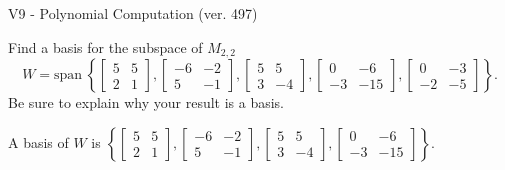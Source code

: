 \begin{exercise}
  \begin{exerciseTitle}V9 - Polynomial Computation (ver. 497)\end{exerciseTitle}
  \begin{exerciseStatement}
    Find a basis for the subspace of \(M_{2,2}\) 
\[W=\mathrm{span}\ \left\{\left[\begin{array}{cc}
5 & 5 \\
2 & 1
\end{array}\right] , \left[\begin{array}{cc}
-6 & -2 \\
5 & -1
\end{array}\right] , \left[\begin{array}{cc}
5 & 5 \\
3 & -4
\end{array}\right] , \left[\begin{array}{cc}
0 & -6 \\
-3 & -15
\end{array}\right] , \left[\begin{array}{cc}
0 & -3 \\
-2 & -5
\end{array}\right]\right\}.\]
 Be sure to explain why your result is a basis.


  \end{exerciseStatement}
  \begin{exerciseAnswer}
   A basis of \(W\) is  \(\left\{\left[\begin{array}{cc}
5 & 5 \\
2 & 1
\end{array}\right] , \left[\begin{array}{cc}
-6 & -2 \\
5 & -1
\end{array}\right] , \left[\begin{array}{cc}
5 & 5 \\
3 & -4
\end{array}\right] , \left[\begin{array}{cc}
0 & -6 \\
-3 & -15
\end{array}\right]\right\}\).
  


  \end{exerciseAnswer}
\end{exercise}